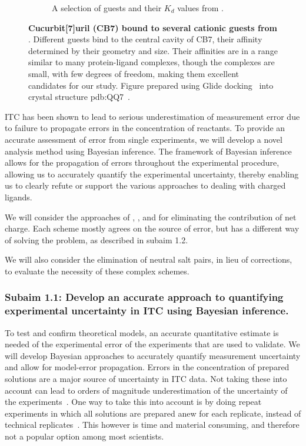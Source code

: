 \documentclass[10pt,final]{article}
\begin{document}
\begin{figure}[H]
\begin{subfigure}{.5\textwidth}
  \caption{A selection of guests and their $K_d$ values from \textcite{Cao2013a}.}
  \label{fig:sub2}
\end{subfigure}
\caption{\textbf{Cucurbit[7]uril (CB7) bound to several cationic guests from \textcite{Cao2013a}}. Different guests bind to the central cavity of CB7, their affinity determined by their geometry and size. Their affinities are in a range similar to many protein-ligand complexes, though the complexes are small, with few degrees of freedom, making them excellent candidates for our study. Figure prepared using Glide docking~\autocite{Halgren2004a,Friesner2004a,Friesner2006a,Schroedinger2014a} into crystal structure pdb:QQ7~\autocite{Feng2004a}.}
\label{figure:host-guest}
\end{figure}

ITC has been shown to lead to serious underestimation of measurement error due to failure to propagate errors in the concentration of reactants\autocite{Myszka2003a,Tellinghuisen2011a}. To provide an accurate assessment of error from single experiments, we will develop a novel analysis method using Bayesian inference.
%
The framework of Bayesian inference allows for the propagation of errors throughout the experimental procedure, allowing us to accurately quantify the experimental uncertainty, thereby enabling us to clearly refute or support the various approaches to dealing with charged ligands.

We will consider the approaches of \textcite{Reif2013a}, \textcite{Rocklin2013a}, and \textcite{Lin2014a} for eliminating the contribution of net charge.  Each scheme mostly agrees on the source of error, but has a different way of solving the problem, as described in subaim 1.2. 

We will also consider the elimination of neutral salt pairs, in lieu of corrections, to evaluate the necessity of these complex schemes.


\subsubsection*{Subaim 1.1: Develop an accurate approach to quantifying experimental uncertainty in ITC using Bayesian inference.}
To test and confirm theoretical models, an accurate quantitative estimate is needed of the experimental error of the experiments that are used to validate.
%
We will develop Bayesian approaches to accurately quantify measurement uncertainty and allow for model-error propagation. 
Errors in the concentration of prepared solutions are a major source of uncertainty in ITC data. Not taking these into account can lead to orders of magnitude underestimation of the uncertainty of the experiments~\autocite{Myszka2003a,Tellinghuisen2011a}.
One way to take this into account is by doing repeat experiments in which all solutions are prepared anew for each replicate, instead of technical replicates~\autocite{Vaux2012a}. This however is time and material consuming, and therefore not a popular option among most scientists. 
\end{document}

